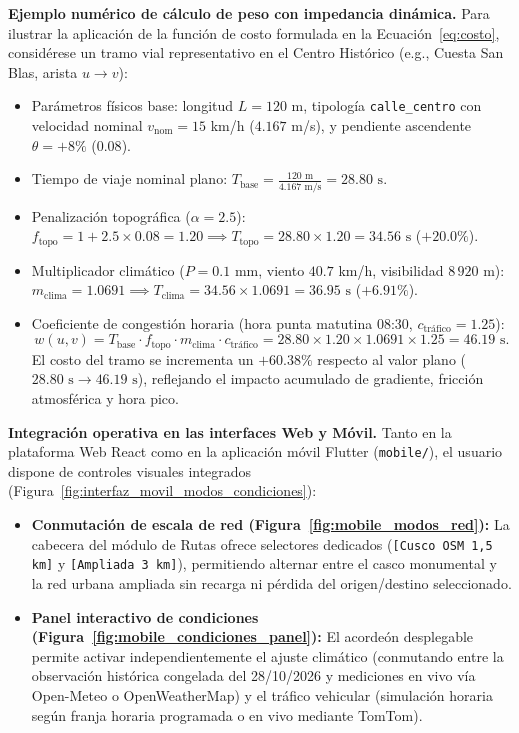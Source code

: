 \noindent\textbf{Ejemplo numérico de cálculo de peso con impedancia dinámica.}
Para ilustrar la aplicación de la función de costo formulada en la Ecuación~\eqref{eq:costo}, considérese un tramo vial representativo en el Centro Histórico (e.g., Cuesta San Blas, arista $u \to v$):
\begin{itemize}
    \item Parámetros físicos base: longitud $L = 120$ m, tipología \texttt{calle\_centro} con velocidad nominal $v_{\text{nom}} = 15$ km/h ($4.167$ m/s), y pendiente ascendente $\theta = +8\%$ ($0.08$).
    \item Tiempo de viaje nominal plano: $T_{\text{base}} = \frac{120\text{ m}}{4.167\text{ m/s}} = 28.80\text{ s}$.
    \item Penalización topográfica ($\alpha = 2.5$): $f_{\text{topo}} = 1 + 2.5 \times 0.08 = 1.20 \implies T_{\text{topo}} = 28.80 \times 1.20 = 34.56\text{ s}$ ($+20.0\%$).
    \item Multiplicador climático ($P=0.1$ mm, viento $40.7$ km/h, visibilidad $8\,920$ m): $m_{\text{clima}} = 1.0691 \implies T_{\text{clima}} = 34.56 \times 1.0691 = 36.95\text{ s}$ ($+6.91\%$).
    \item Coeficiente de congestión horaria (hora punta matutina 08:30, $c_{\text{tráfico}} = 1.25$):
    \begin{equation}
        w(u, v) = T_{\text{base}} \cdot f_{\text{topo}} \cdot m_{\text{clima}} \cdot c_{\text{tráfico}} = 28.80 \times 1.20 \times 1.0691 \times 1.25 = 46.19\text{ s}.
    \end{equation}
    El costo del tramo se incrementa un $+60.38\%$ respecto al valor plano ($28.80\text{ s} \to 46.19\text{ s}$), reflejando el impacto acumulado de gradiente, fricción atmosférica y hora pico.
\end{itemize}

\noindent\textbf{Integración operativa en las interfaces Web y Móvil.}
Tanto en la plataforma Web React como en la aplicación móvil Flutter (\texttt{mobile/}), el usuario dispone de controles visuales integrados (Figura~\ref{fig:interfaz_movil_modos_condiciones}):
\begin{itemize}
    \item \textbf{Conmutación de escala de red (Figura~\ref{fig:mobile_modos_red}):} La cabecera del módulo de Rutas ofrece selectores dedicados (\texttt{[Cusco OSM 1,5 km]} y \texttt{[Ampliada 3 km]}), permitiendo alternar entre el casco monumental y la red urbana ampliada sin recarga ni pérdida del origen/destino seleccionado.
    \item \textbf{Panel interactivo de condiciones (Figura~\ref{fig:mobile_condiciones_panel}):} El acordeón desplegable permite activar independientemente el ajuste climático (conmutando entre la observación histórica congelada del 28/10/2026 y mediciones en vivo vía Open-Meteo o OpenWeatherMap) y el tráfico vehicular (simulación horaria según franja horaria programada o en vivo mediante TomTom).
\end{itemize}

